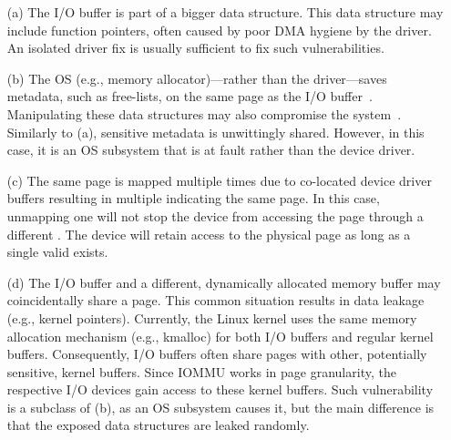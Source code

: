 \begin{enumerate}
    \item[(a)] The I/O buffer is part of a bigger data structure. This data structure may include function pointers, often caused by poor DMA hygiene by the driver. An isolated driver fix is usually sufficient to fix such vulnerabilities.
    \item[(b)] The OS (e.g., memory allocator)---rather than the driver---saves metadata, such as free-lists, on the same page as the I/O buffer~\cite{Cor07}. Manipulating these data structures may also compromise the system~\cite{ak09}. Similarly to (a), sensitive metadata is unwittingly shared. However, in this case, it is an OS subsystem that is at fault rather than the device driver.
    \item[(c)] The same page is mapped multiple times due to co-located device driver buffers resulting in multiple \iova{} indicating the same page. 
    In this case, unmapping one \iova will not stop the device from accessing the page through a different \iova.
    The device will retain access to the physical page as long as a single valid \iova{} exists. \DIFaddbegin {}\iova {}\DIFaddend \item[(d)] The I/O buffer and a different, dynamically allocated memory buffer may coincidentally share a page. This common situation results in data leakage (e.g., kernel pointers). Currently, the Linux kernel uses the same memory allocation mechanism (e.g., kmalloc) for both I/O buffers and regular kernel buffers. Consequently, I/O buffers often share pages with other, potentially sensitive, kernel buffers. Since IOMMU works in page granularity, the respective I/O devices gain access to these kernel buffers. Such vulnerability is a subclass of (b), as an OS subsystem causes it, but the main difference is that the exposed data structures are leaked randomly.
\end{enumerate}

